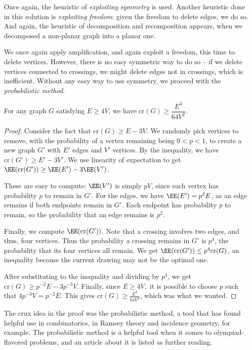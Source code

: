 \documentclass[11pt,paper=letter]{scrartcl}
\newcommand{\crs}[1]{\mathrm{cr}(#1)}
\begin{document}
Once again, the heuristic of \emph{exploiting symmetry} is used. Another heuristic done in this solution is \emph{exploiting freedom}: given the freedom to delete edges, we do so. And again, the heuristic of decomposition and recomposition appears, when we decomposed a non-planar graph into a planar one.

We once again apply amplification, and again exploit a freedom, this time to delete vertices. However, there is no easy symmetric way to do so -- if we delete vertices connected to crossings, we might delete edges not in crossings, which is inefficient. Without any easy way to use symmetry, we proceed with the \emph{probabilistic method}.

\begin{theorem}
For any graph $G$ satisfying $E \geq 4V$, we have $\crs{G} \geq \dfrac{E^3}{64V^2}$.
\end{theorem}

\begin{proof}
Consider the fact that $\crs{G} \geq E - 3V$. We randomly pick vertices to remove, with the probability of a vertex remaining being $0 < p < 1$, to create a new graph $G'$ with $E'$ edges and $V'$ vertices. By the inequality, we have $\crs{G'} \geq E' - 3V'$. We use linearity of expectation to get $\EE(\crs{G'}) \geq \EE(E') - 3\EE(V')$.

These are easy to compute: $\EE(V')$ is simply $pV$, since each vertex has probability $p$ to remain in $G'$. For the edges, we have $\EE(E') = p^2E$, as an edge remains if both endpoints remain in $G'$. Each endpoint has probability $p$ to remain, so the probability that an edge remains is $p^2$.

Finally, we compute $\EE(\crs{G'})$. Note that a crossing involves two edges, and thus, four vertices. Thus the probability a crossing remains in $G'$ is $p^4$, the probability that its four vertices all remain. We get $\EE(\crs{G'}) \leq p^4\crs{G}$, an inequality because the current drawing may not be the optimal one.

After substituting to the inequality and dividing by $p^4$, we get $\crs{G} \geq p^{-2}E - 3p^{-3}V$. Finally, since $E \geq 4V,$ it is possible to choose $p$ such that $4p^{-3}V = p^{-2}E$. This gives $\crs{G} \geq \frac{E^3}{64V^2}$, which was what we wanted.
\end{proof}

The crux idea in the proof was the probabilistic method, a tool that has found helpful use in combinatorics, in Ramsey theory and incidence geometry, for example. The probabilistic method is a helpful tool when it comes to olympiad-flavored problems, and an article about it is listed as further reading. \cite{chen}
\end{document}
